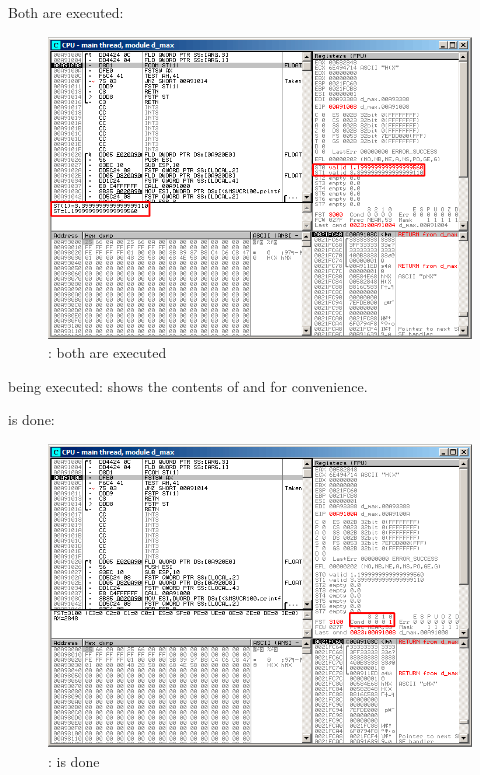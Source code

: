 ﻿\clearpage
{}
\myindex{\olly}

Both \FLD are executed:

\begin{figure}[H]
\centering
\includegraphics[scale=\FigScale]{patterns/12_FPU/3_comparison/x86/MSVC_Ox/olly1_1.png}
\caption{\olly: both \FLD are executed}
\label{fig:FPU_comparison_Ox_case1_olly1}
\end{figure}

\FCOM being executed: 
\olly shows the contents of  and  %
for convenience.

\clearpage
\FCOM is done:

\begin{figure}[H]
\centering
\includegraphics[scale=\FigScale]{patterns/12_FPU/3_comparison/x86/MSVC_Ox/olly1_2.png}
\caption{\olly: \FCOM is done}
\label{fig:FPU_comparison_Ox_case1_olly2}
\end{figure}

